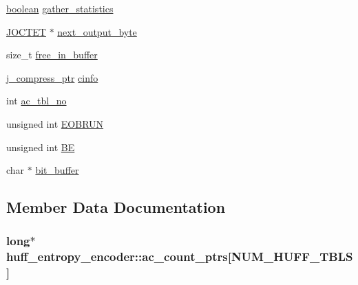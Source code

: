 \begin{DoxyCompactItemize}
\item 
\hyperlink{jmorecfg_8h_a7c6368b321bd9acd0149b030bb8275ed}{boolean} \hyperlink{structhuff__entropy__encoder_ac32b3f950c2755e14bdcdbb9d5c83c82}{gather\+\_\+statistics}
\item 
\hyperlink{jmorecfg_8h_a356ad249f20e691b520da439f92cccbc}{J\+O\+C\+T\+E\+T} $\ast$ \hyperlink{structhuff__entropy__encoder_ad7be281727ae2a6488c8b37b017c1f40}{next\+\_\+output\+\_\+byte}
\item 
size\+\_\+t \hyperlink{structhuff__entropy__encoder_af8e2d1d3eb92b83376c1b6e194e54660}{free\+\_\+in\+\_\+buffer}
\item 
\hyperlink{jpeglib_8h_add2a072c54e3a51550f4975f7ddb91e7}{j\+\_\+compress\+\_\+ptr} \hyperlink{structhuff__entropy__encoder_a46ddb16b709ccae209e295480f2d38b6}{cinfo}
\item 
int \hyperlink{structhuff__entropy__encoder_a43f8a73e36740cd79fde6e45efef6d16}{ac\+\_\+tbl\+\_\+no}
\item 
unsigned int \hyperlink{structhuff__entropy__encoder_aeec45e042ccea57047e6a7dad5470f2b}{E\+O\+B\+R\+U\+N}
\item 
unsigned int \hyperlink{structhuff__entropy__encoder_a60927ee1fdfb068cb003c17587770a2b}{B\+E}
\item 
char $\ast$ \hyperlink{structhuff__entropy__encoder_adc619a5c8cb0398b78fb015c618ffdea}{bit\+\_\+buffer}
\end{DoxyCompactItemize}


\subsection{Member Data Documentation}
\hypertarget{structhuff__entropy__encoder_acc141b7e17ee817d92b9340d603dde9e}{}
\subsubsection[{ac\+\_\+count\+\_\+ptrs}]{\setlength{\rightskip}{0pt plus 5cm}long$\ast$ huff\+\_\+entropy\+\_\+encoder\+::ac\+\_\+count\+\_\+ptrs\mbox{[}{\bf N\+U\+M\+\_\+\+H\+U\+F\+F\+\_\+\+T\+B\+L\+S}\mbox{]}}\label{structhuff__entropy__encoder_acc141b7e17ee817d92b9340d603dde9e}
\hypertarget{structhuff__entropy__encoder_a0b67beb3a73da24b5d09693f3c0c8b22}{}
